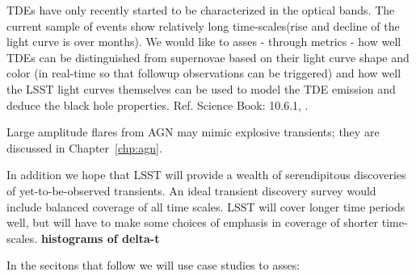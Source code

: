 TDEs have only recently started to be characterized in the optical bands. The current sample of events show relatively long time-scales(rise and decline of the light curve is over months). We would like to asses - through metrics - how well TDEs can be distinguished from supernovae based on their light curve shape and color (in real-time so that followup observations can be triggered) and how well the LSST light curves themselves can be used to model the TDE emission and deduce the black hole properties.
Ref. Science Book: 10.6.1, \citet{Gezari2012, Chornock2014, Arcavi2014, Holoien2014, Holoien2016, Holoien2016a}.

Large amplitude flares from AGN may mimic
explosive transients; they are discussed in Chapter~\ref{chp:agn}.

In addition we hope that LSST will provide a wealth of serendipitous
discoveries of yet-to-be-observed transients.  An ideal transient
discovery survey would include balanced coverage of all time scales. LSST
will cover longer time periods well, but will have to make some
choices of emphasis in coverage of shorter time-scales. 
\textbf{histograms of delta-t}

In the secitons that follow we will use case studies to asses:

